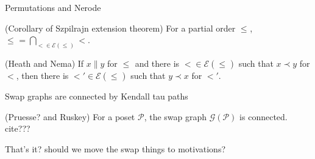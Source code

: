 \documentclass[12pt]{llncs}
\let\oldleq\leq
\renewcommand{\leq}[1][]{\oldleq_{#1}}
\newcommand{\poset}[1]{\mathcal{#1}}
\newcommand{\incomp}{\parallel}
\newcommand{\covered}{\prec}
\begin{document}
{\begin{theorem}
    Permutations and Nerode
\end{theorem}

\begin{theorem}
    (Corollary of Szpilrajn extension theorem) For a partial order $\leq$, $\leq = \bigcap_{< \in \mathcal{E}(\leq)} <$.
\end{theorem}

\begin{theorem}
    (Heath and Nema) If $x \incomp y$ for $\leq$ and there is $< \in \mathcal{E}(\leq)$ such that $x \covered y$ for $<$, then there is $<' \in \mathcal{E}(\leq)$ such that $y \covered x$ for $<'$.
\end{theorem}

\begin{theorem}
    Swap graphs are connected by Kendall tau paths
\end{theorem}

\begin{theorem}
    \label{theorem:szpilrajn}
\end{theorem}

\begin{theorem}
    (Pruesse? and Ruskey) For a poset $\poset{P}$, the swap graph $\mathcal{G}(\poset{P})$ is connected. cite???
\end{theorem}

That's it? should we move the swap things to motivations?}
\end{document}
